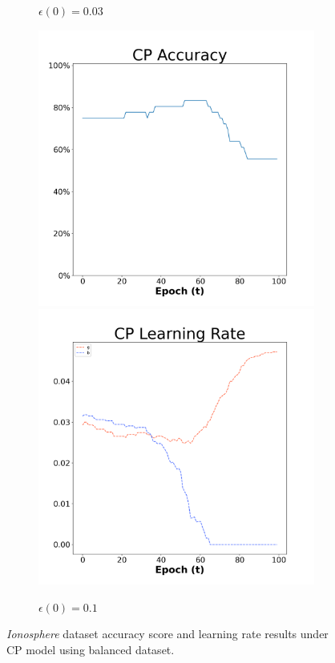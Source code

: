 \begin{figure}[H]
\begin{subfigure}{0.3\textwidth}
  \caption{$\epsilon(0)=0.03$}
\end{subfigure}\hfil %
\begin{subfigure}{0.3\textwidth}
  \includegraphics[width=\linewidth]{images/exper1/Ionosphere/CP_0.1_acc.png}
  \includegraphics[width=\linewidth]{images/exper1/Ionosphere/CP_0.1_lr.png}
  \caption{$\epsilon(0)=0.1$}\label{ioncp1}
\end{subfigure}

\caption{\textit{Ionosphere} dataset accuracy score and learning rate results under CP model using balanced dataset.}
\end{figure}

